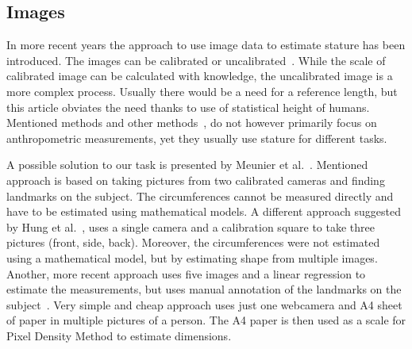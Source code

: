 \subsection{Images}

In more recent years the approach to use image data to estimate stature has been introduced. The images can be calibrated or uncalibrated~\cite{estimationImages, image}. While the scale of calibrated image can be calculated with knowledge, the uncalibrated image is a more complex process. Usually there would be a need for a reference length, but this article obviates the need thanks to use of statistical height of humans. Mentioned methods and other methods~\cite{image2}, do not however primarily focus on anthropometric measurements, yet they usually use stature for different tasks. 

A possible solution to our task is presented by Meunier et al.~\cite{image2DMeasurements}. Mentioned approach is based on taking pictures from two calibrated cameras and finding landmarks on the subject. The circumferences cannot be measured directly and have to be estimated using mathematical models. A different approach suggested by Hung et al.~\cite{image2DMeasurements2}, uses a single camera and a calibration square to take three pictures (front, side, back). Moreover, the circumferences were not estimated using a mathematical model, but by estimating shape from multiple images.  Another, more recent approach uses five images and a linear regression to estimate the measurements, but uses manual annotation of the landmarks on the subject~\cite{images}. Very simple and cheap approach uses just one webcamera and A4 sheet of paper in multiple pictures of a person. The A4 paper is then used as a scale for Pixel Density Method to estimate dimensions.

